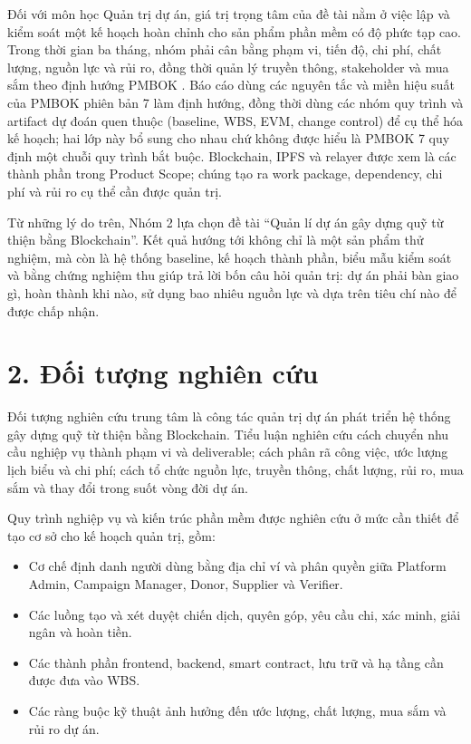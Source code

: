 Đối với môn học Quản trị dự án, giá trị trọng tâm của đề tài nằm ở việc lập và kiểm soát một kế hoạch hoàn chỉnh cho sản phẩm phần mềm có độ phức tạp cao. Trong thời gian ba tháng, nhóm phải cân bằng phạm vi, tiến độ, chi phí, chất lượng, nguồn lực và rủi ro, đồng thời quản lý truyền thông, stakeholder và mua sắm theo định hướng PMBOK \cite{pmbok2021}. Báo cáo dùng các nguyên tắc và miền hiệu suất của PMBOK phiên bản 7 làm định hướng, đồng thời dùng các nhóm quy trình và artifact dự đoán quen thuộc (baseline, WBS, EVM, change control) để cụ thể hóa kế hoạch; hai lớp này bổ sung cho nhau chứ không được hiểu là PMBOK 7 quy định một chuỗi quy trình bắt buộc. Blockchain, IPFS và relayer được xem là các thành phần trong Product Scope; chúng tạo ra work package, dependency, chi phí và rủi ro cụ thể cần được quản trị.

Từ những lý do trên, Nhóm 2 lựa chọn đề tài ``Quản lí dự án gây dựng quỹ từ thiện bằng Blockchain''. Kết quả hướng tới không chỉ là một sản phẩm thử nghiệm, mà còn là hệ thống baseline, kế hoạch thành phần, biểu mẫu kiểm soát và bằng chứng nghiệm thu giúp trả lời bốn câu hỏi quản trị: dự án phải bàn giao gì, hoàn thành khi nào, sử dụng bao nhiêu nguồn lực và dựa trên tiêu chí nào để được chấp nhận.

\section*{2. Đối tượng nghiên cứu}

Đối tượng nghiên cứu trung tâm là công tác quản trị dự án phát triển hệ thống gây dựng quỹ từ thiện bằng Blockchain. Tiểu luận nghiên cứu cách chuyển nhu cầu nghiệp vụ thành phạm vi và deliverable; cách phân rã công việc, ước lượng lịch biểu và chi phí; cách tổ chức nguồn lực, truyền thông, chất lượng, rủi ro, mua sắm và thay đổi trong suốt vòng đời dự án.

Quy trình nghiệp vụ và kiến trúc phần mềm được nghiên cứu ở mức cần thiết để tạo cơ sở cho kế hoạch quản trị, gồm:

\begin{itemize}
  \item Cơ chế định danh người dùng bằng địa chỉ ví và phân quyền giữa Platform Admin, Campaign Manager, Donor, Supplier và Verifier.
  \item Các luồng tạo và xét duyệt chiến dịch, quyên góp, yêu cầu chi, xác minh, giải ngân và hoàn tiền.
  \item Các thành phần frontend, backend, smart contract, lưu trữ và hạ tầng cần được đưa vào WBS.
  \item Các ràng buộc kỹ thuật ảnh hưởng đến ước lượng, chất lượng, mua sắm và rủi ro dự án.
\end{itemize}

